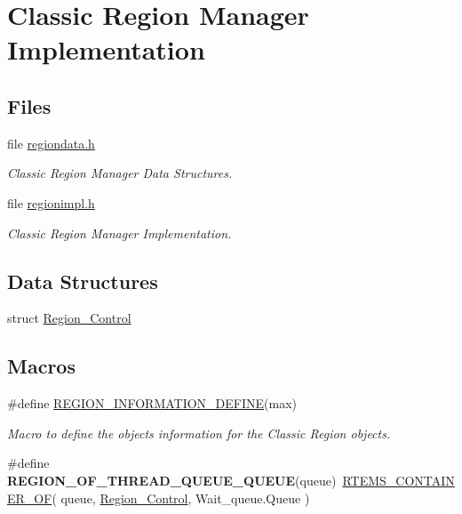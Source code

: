 \hypertarget{group__ClassicRegionImpl}{}\section{Classic Region Manager Implementation}
\label{group__ClassicRegionImpl}
\subsection*{Files}
\begin{DoxyCompactItemize}
\item 
file \mbox{\hyperlink{regiondata_8h}{regiondata.\+h}}
\begin{DoxyCompactList}\small\item\em Classic Region Manager Data Structures. \end{DoxyCompactList}\item 
file \mbox{\hyperlink{regionimpl_8h}{regionimpl.\+h}}
\begin{DoxyCompactList}\small\item\em Classic Region Manager Implementation. \end{DoxyCompactList}\end{DoxyCompactItemize}
\subsection*{Data Structures}
\begin{DoxyCompactItemize}
\item 
struct \mbox{\hyperlink{structRegion__Control}{Region\+\_\+\+Control}}
\end{DoxyCompactItemize}
\subsection*{Macros}
\begin{DoxyCompactItemize}
\item 
\#define \mbox{\hyperlink{group__ClassicRegionImpl_ga5fa5a3a4f9186420c3e6145b28f92d13}{R\+E\+G\+I\+O\+N\+\_\+\+I\+N\+F\+O\+R\+M\+A\+T\+I\+O\+N\+\_\+\+D\+E\+F\+I\+NE}}(max)
\begin{DoxyCompactList}\small\item\em Macro to define the objects information for the Classic Region objects. \end{DoxyCompactList}\item 
\mbox{\label{group__ClassicRegionImpl_gac56339a4e3cff4254f1267fef1cbfaf8}} 
\#define {\bfseries R\+E\+G\+I\+O\+N\+\_\+\+O\+F\+\_\+\+T\+H\+R\+E\+A\+D\+\_\+\+Q\+U\+E\+U\+E\+\_\+\+Q\+U\+E\+UE}(queue)~\mbox{\hyperlink{group__RTEMSScoreBaseDefs_gab2e7a0141fd898ae358fa9b134aa2610}{R\+T\+E\+M\+S\+\_\+\+C\+O\+N\+T\+A\+I\+N\+E\+R\+\_\+\+OF}}( queue, \mbox{\hyperlink{structRegion__Control}{Region\+\_\+\+Control}}, Wait\+\_\+queue.\+Queue )
\end{DoxyCompactItemize}

